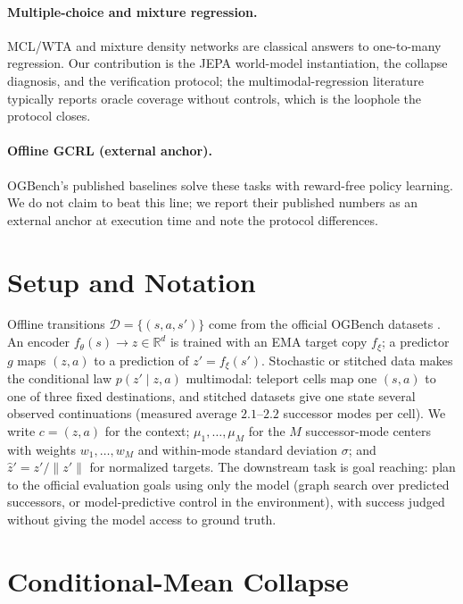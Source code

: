 \documentclass[letterpaper]{article}
\begin{document}
\paragraph{Multiple-choice and mixture regression.}
MCL/WTA \citep{guzman2012multiple,lee2016stochastic} and mixture density networks
\citep{bishop1994mixture} are classical answers to one-to-many regression. Our contribution is the JEPA
world-model instantiation, the collapse diagnosis, and the verification protocol; the
multimodal-regression literature typically reports oracle coverage without controls, which is the loophole the
protocol closes.

\paragraph{Offline GCRL (external anchor).}
OGBench's published baselines \citep{park2025ogbench,park2023hiql,wang2023qrl,eysenbach2022crl,%
ghosh2021gcbc} solve these tasks with reward-free policy learning. We do not claim to beat this line; we
report their published numbers as an external anchor at execution time and note the protocol differences.

\section{Setup and Notation}

Offline transitions $\mathcal{D}=\{(s,a,s')\}$ come from the official OGBench datasets
\citep{park2025ogbench}. An encoder $f_\theta(s)\to z\in\mathbb{R}^d$ is trained with an EMA target copy
$f_\xi$; a predictor $g$ maps $(z,a)$ to a prediction of $z'=f_\xi(s')$. Stochastic or stitched data makes
the conditional law $p(z'\mid z,a)$ multimodal: teleport cells map one $(s,a)$ to one of three fixed
destinations, and stitched datasets give one state several observed continuations (measured average
$2.1$--$2.2$ successor modes per cell). We write $c=(z,a)$ for the context; $\mu_1,\dots,\mu_M$ for the
$M$ successor-mode centers with weights $w_1,\dots,w_M$ and within-mode standard deviation $\sigma$; and
$\hat z' = z'/\lVert z'\rVert$ for normalized targets. The downstream task is goal reaching: plan to the
official evaluation goals using only the model (graph search over predicted successors, or model-predictive
control in the environment), with success judged without giving the model access to ground truth.

\section{Conditional-Mean Collapse}
\end{document}
